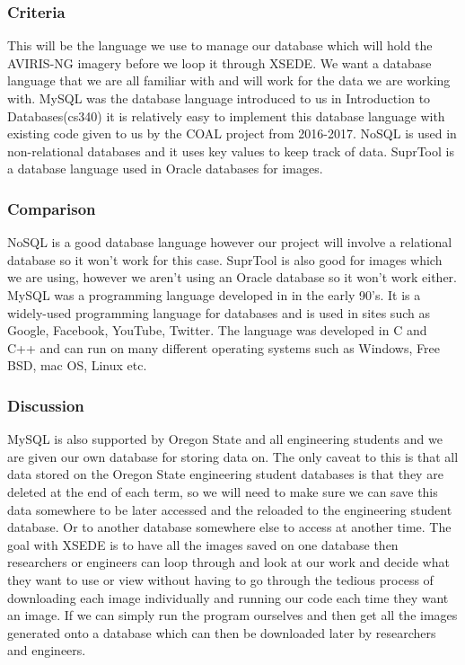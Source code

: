 \documentclass[10pt,draftclsnofoot,onecolumn,journal,compsoc]{IEEEtran}
\begin{document}
\subsubsection{Criteria}

\noindent This will be the language we use to manage our database which will hold the AVIRIS-NG imagery before we loop it through XSEDE. We want a database language that we are all familiar with and will work for the data we are working with. MySQL was the database language introduced to us in Introduction to Databases(cs340) it is relatively easy to implement this database language with existing code given to us by the COAL project from 2016-2017. NoSQL is used in non-relational databases and it uses key values to keep track of data. SuprTool is a database language used in Oracle databases for images.

\subsubsection{Comparison}

\noindent NoSQL is a good database language however our project will involve a relational database so it won’t work for this case. SuprTool is also good for images which we are using, however we aren’t using an Oracle database so it won’t work either. MySQL was a programming language developed in in the early 90’s. It is a widely-used programming language for databases and is used in sites such as Google, Facebook, YouTube, Twitter. The language was developed in C and C++ and can run on many different operating systems such as Windows, Free BSD, mac OS, Linux etc.

\subsubsection{Discussion}

\noindent MySQL is also supported by Oregon State and all engineering students and we are given our own database for storing data on. The only caveat to this is that all data stored on the Oregon State engineering student databases is that they are deleted at the end of each term, so we will need to make sure we can save this data somewhere to be later accessed and the reloaded to the engineering student database. Or to another database somewhere else to access at another time. The goal with XSEDE is to have all the images saved on one database then researchers or engineers can loop through and look at our work and decide what they want to use or view without having to go through the tedious process of downloading each image individually and running our code each time they want an image. If we can simply run the program ourselves and then get all the images generated onto a database which can then be downloaded later by researchers and engineers.
\end{document}
